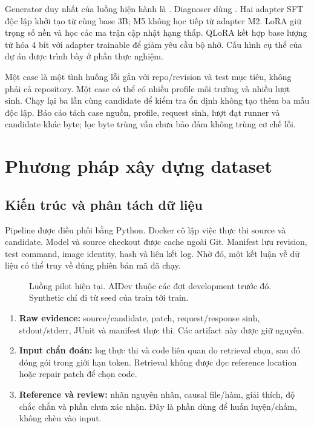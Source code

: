 \documentclass[12pt,a4paper]{article}
\begin{document}
Generator duy nhất của luồng hiện hành là . Diagnoser dùng \cite{qwen}. Hai adapter SFT độc lập khởi tạo từ cùng base 3B; M5 không học tiếp từ adapter M2. LoRA giữ trọng số nền và học các ma trận cập nhật hạng thấp\cite{lora}. QLoRA kết hợp base lượng tử hóa 4 bit với adapter trainable để giảm yêu cầu bộ nhớ\cite{qlora}. Cấu hình cụ thể của dự án được trình bày ở phần thực nghiệm.

Một case là một tình huống lỗi gắn với repo/revision và test mục tiêu, không phải cả repository. Một case có thể có nhiều profile môi trường và nhiều lượt sinh. Chạy lại ba lần cùng candidate để kiểm tra ổn định không tạo thêm ba mẫu độc lập. Báo cáo tách case nguồn, profile, request sinh, lượt đạt runner và candidate khác byte; lọc byte trùng vẫn chưa bảo đảm không trùng cơ chế lỗi.

\nextpage
\section{Phương pháp xây dựng dataset}
\subsection{Kiến trúc và phân tách dữ liệu}
Pipeline được điều phối bằng Python. Docker cô lập việc thực thi source và candidate. Model và source checkout được cache ngoài Git. Manifest lưu revision, test command, image identity, hash và liên kết log. Nhờ đó, một kết luận về dữ liệu có thể truy về đúng phiên bản mã đã chạy.

\begin{figure}[h]\centering
\resizebox{\linewidth}{!}{}
\caption{Luồng pilot hiện tại. AIDev thuộc các đợt development trước đó. Synthetic chỉ đi từ seed của train tới train.}
\end{figure}

\begin{enumerate}
\item \textbf{Raw evidence:} source/candidate, patch, request/response sinh, stdout/stderr, JUnit và manifest thực thi. Các artifact này được giữ nguyên.
\item \textbf{Input chẩn đoán:} log thực thi và code liên quan do retrieval chọn, sau đó đóng gói trong giới hạn token. Retrieval không được đọc reference location hoặc repair patch để chọn code.
\item \textbf{Reference và review:} nhãn nguyên nhân, causal file/hàm, giải thích, độ chắc chắn và phần chưa xác nhận. Đây là phần dùng để huấn luyện/chấm, không chèn vào input.
\end{enumerate}
\end{document}
